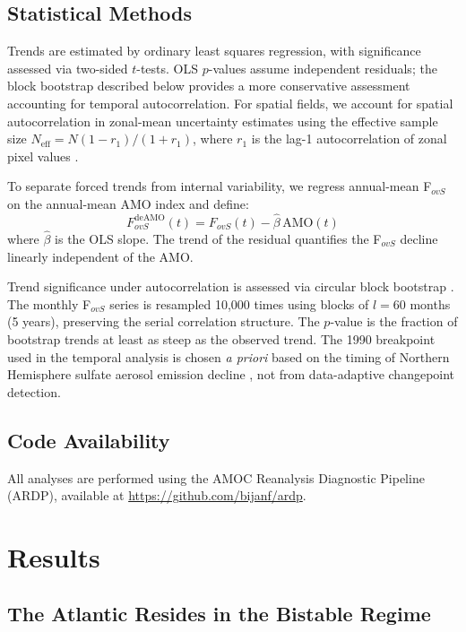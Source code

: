 \documentclass{agujournal2019}
\begin{document}
\subsection{Statistical Methods}

Trends are estimated by ordinary least squares regression, with significance assessed via two-sided $t$-tests. OLS $p$-values assume independent residuals; the block bootstrap described below provides a more conservative assessment accounting for temporal autocorrelation. For spatial fields, we account for spatial autocorrelation in zonal-mean uncertainty estimates using the effective sample size $N_\text{eff} = N(1-r_1)/(1+r_1)$, where $r_1$ is the lag-1 autocorrelation of zonal pixel values \cite{Bretherton1999}.

To separate forced trends from internal variability, we regress annual-mean F$_{ovS}$ on the annual-mean AMO index and define:
\begin{equation}
F_{ovS}^\mathrm{deAMO}(t) = F_{ovS}(t) - \hat{\beta}\,\mathrm{AMO}(t)
\label{eq:deamo}
\end{equation}
where $\hat{\beta}$ is the OLS slope. The trend of the residual quantifies the F$_{ovS}$ decline linearly independent of the AMO.

Trend significance under autocorrelation is assessed via circular block bootstrap \cite{Politis1994}. The monthly F$_{ovS}$ series is resampled 10,000 times using blocks of $l=60$ months (5 years), preserving the serial correlation structure. The $p$-value is the fraction of bootstrap trends at least as steep as the observed trend. The 1990 breakpoint used in the temporal analysis is chosen \emph{a priori} based on the timing of Northern Hemisphere sulfate aerosol emission decline \cite{Booth2012}, not from data-adaptive changepoint detection.

\subsection{Code Availability}

All analyses are performed using the AMOC Reanalysis Diagnostic Pipeline (ARDP), available at \url{https://github.com/bijanf/ardp}.


\section{Results}

\subsection{The Atlantic Resides in the Bistable Regime}
\end{document}
